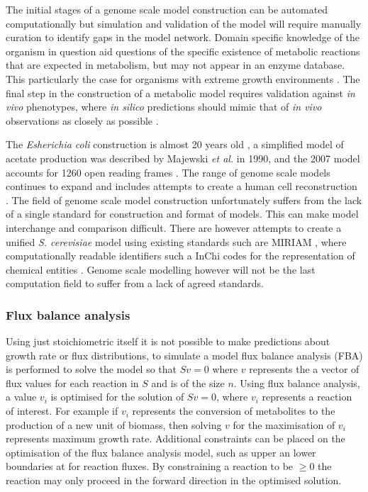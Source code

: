 The initial stages of a genome scale model construction can be automated computationally but simulation and validation of the model will require manually curation to identify gaps in the model network. Domain specific knowledge of the organism in question aid questions of the specific existence of metabolic reactions that are expected in metabolism, but may not appear in an enzyme database. This particularly the case for organisms with extreme growth environments \cite{sun2009}. The final step in the construction of a metabolic model requires validation against \emph{in vivo} phenotypes, where \emph{in silico} predictions should mimic that of \emph{in vivo} observations as closely as possible \cite{famili2003}.

The \emph{Esherichia coli} construction is almost 20 years old \cite{feist2008}, a simplified model of acetate production was described by Majewski \emph{et al.} in 1990, and the 2007 model accounts for 1260 open reading frames \cite{feist2007}. The range of genome scale models continues to expand and includes attempts to create a human cell reconstruction \cite{duarte2007}. The field of genome scale model construction unfortunately suffers from the lack of a single standard for construction and format of models. This can make model interchange and comparison difficult. There are however attempts to create a unified \emph{S. cerevisiae} model \cite{herrgard2008} using existing standards such are MIRIAM \cite{lenovere2005}, where computationally readable identifiers such a InChi codes for the representation of chemical entities \cite{coles2005}. Genome scale modelling however will not be the last computation field to suffer from a lack of agreed standards.

\subsubsection{Flux balance analysis}

Using just stoichiometric itself it is not possible to make predictions about growth rate or flux distributions, to simulate a model flux balance analysis (FBA) is performed to solve the model so that $S v = 0$ where $v$ represents the a vector of flux values for each reaction in $S$ and is of the size $n$. Using flux balance analysis, a value $v_{i}$ is optimised for the solution of $S v = 0$, where $v_{i}$ represents a reaction of interest. For example if $v_{i}$ represents the conversion of metabolites to the production of a new unit of biomass, then solving $v$ for the maximisation of $v_{i}$ represents maximum growth rate. Additional constraints can be placed on the optimisation of the flux balance analysis model, such as upper an lower boundaries at for reaction fluxes. By constraining a reaction to be $\geq 0$ the reaction may only proceed in the forward direction in the optimised solution.

